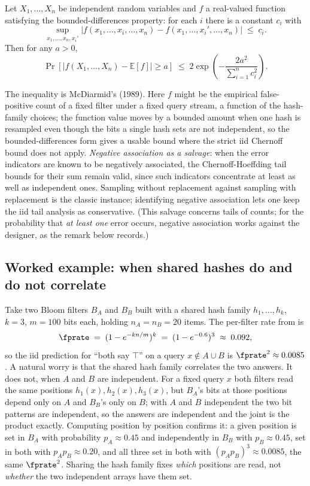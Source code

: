 \begin{proposition}
\label{prop:mcdiarmid}
Let $X_1, \ldots, X_n$ be independent random variables and $f$ a
real-valued function satisfying the bounded-differences property: for each
$i$ there is a constant $c_i$ with
\[
  \sup_{x_1, \ldots, x_n, x_i'}
  |f(x_1, \ldots, x_i, \ldots, x_n) - f(x_1, \ldots, x_i', \ldots, x_n)|
  \;\le\; c_i.
\]
Then for any $a > 0$,
\[
  \Pr[|f(X_1, \ldots, X_n) - \mathbb{E}[f]| \ge a]
  \;\le\;
  2 \exp\!\left( -\frac{2 a^2}{\sum_{i = 1}^n c_i^2} \right).
\]
\end{proposition}

The inequality is McDiarmid's (1989). Here $f$ might be the empirical
false-positive count of a fixed filter under a fixed query stream, a
function of the hash-family choices; the function value moves by a bounded
amount when one hash is resampled even though the bits a single hash sets
are not independent, so the bounded-differences form gives a usable bound
where the strict iid Chernoff bound does not apply. \emph{Negative
association as a salvage}: when the error indicators are known to be
negatively associated, the Chernoff-Hoeffding tail bounds for their sum
remain valid, since such indicators concentrate at least as well as
independent ones. Sampling without replacement against sampling with
replacement is the classic instance; identifying negative association lets
one keep the iid tail analysis as conservative. (This salvage concerns
tails of counts; for the probability that \emph{at least one} error
occurs, negative association works against the designer, as the remark
below records.)

\subsection*{Worked example: when shared hashes do and do not correlate}

Take two Bloom filters $B_A$ and $B_B$ built with a shared hash family
$h_1, \ldots, h_k$, $k = 3$, $m = 100$ bits each, holding $n_A = n_B = 20$
items. The per-filter rate from  is
\[
  \fprate \;=\; (1 - e^{-k n / m})^k \;=\; (1 - e^{-0.6})^3 \;\approx\; 0.092,
\]
so the iid prediction for ``both say $\top$'' on a query $x \notin A \cup
B$ is $\fprate^2 \approx 0.0085$. A natural worry is that the shared hash
family correlates the two answers. It does not, when $A$ and $B$ are
independent. For a fixed query $x$ both filters read the same positions
$h_1(x), h_2(x), h_3(x)$, but $B_A$'s bits at those positions depend only
on $A$ and $B_B$'s only on $B$; with $A$ and $B$ independent the two bit
patterns are independent, so the answers are independent and the joint is
the product exactly. Computing position by position confirms it: a given
position is set in $B_A$ with probability $p_A \approx 0.45$ and
independently in $B_B$ with $p_B \approx 0.45$, set in both with
$p_A p_B \approx 0.20$, and all three set in both with $(p_A p_B)^3
\approx 0.0085$, the same $\fprate^2$. Sharing the hash family fixes
\emph{which} positions are read, not \emph{whether} the two independent
arrays have them set.

